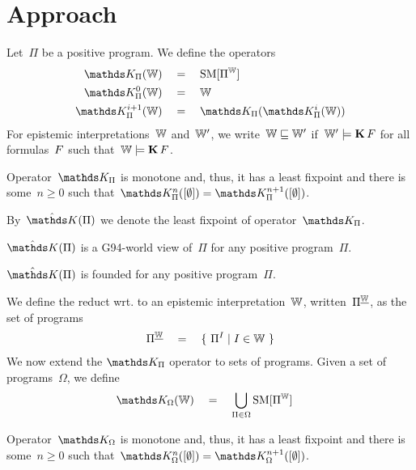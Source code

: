 \section{Approach}\label{sec:approach}

Let~$\Pi$ be a positive program.
%
We define the operators
\begin{align}
    \TKP{\wv} \quad&=\quad \SM[\Pi^\wv]
    \\
    \TKPn{0}{\wv} \quad&=\quad \wv
    \\
    \TKPn{i+1}{\wv} \quad&=\quad \TKP{\TKPn{i}{\wv}}
\end{align}
For epistemic interpretations~$\mathbb{W}$ and~$\mathbb{W}'$, we write~$\mathbb{W} \sqsubseteq \mathbb{W}'$ if~$\mathbb{W}' \models \operatorname{\mathbf{K}}F$ for all formulas~$F$ such that~$\mathbb{W} \models \operatorname{\mathbf{K}}F$.

\begin{conjecture}
    \label{conj:tp.monotone}
    Operator~$\TKPo$ is monotone and, thus, it has a least fixpoint and there is some~$n \geq 0$ such that~$\TKPn{n}{[\emptyset]} = \TKPn{n+1}{[\emptyset]} $.
\end{conjecture}

By~$\TKPf$ we denote the least fixpoint of operator~$\TKPo$.

\begin{conjecture}
    \label{conj:tp.g94}
    $\TKPf$ is a G94-world view of~$\Pi$ for any positive program~$\Pi$.
\end{conjecture}

\begin{conjecture}
    \label{conj:tp.founded}
    $\TKPf$ is founded for any positive program~$\Pi$.
\end{conjecture}


We define the reduct wrt. to an epistemic interpretation~$\mathbb{W}$, written~$\Pi^{\underline{\mathbb{W}}}$, as the set of programs
\begin{gather}
    \Pi^{\underline{\mathbb{W}}} \quad = \quad \{ \ \Pi^I \mid I \in \mathbb{W} \ \}
\end{gather}
We now extend the $\TKPo$ operator to sets of programs. Given a set of programs~$\Omega$, we define
\begin{align}
    \TK{\Omega}{\wv} \quad&=\quad \bigcup_{\Pi \in \Omega} \SM[\Pi^\wv]
\end{align}

\begin{conjecture}
    \label{conj:tp.monotone}
    Operator~$\TKo{\Omega}$ is monotone and, thus, it has a least fixpoint and there is some~$n \geq 0$ such that~$\TKn{\Omega}{n}{[\emptyset]} = \TKn{\Omega}{n+1}{[\emptyset]} $.
\end{conjecture}

